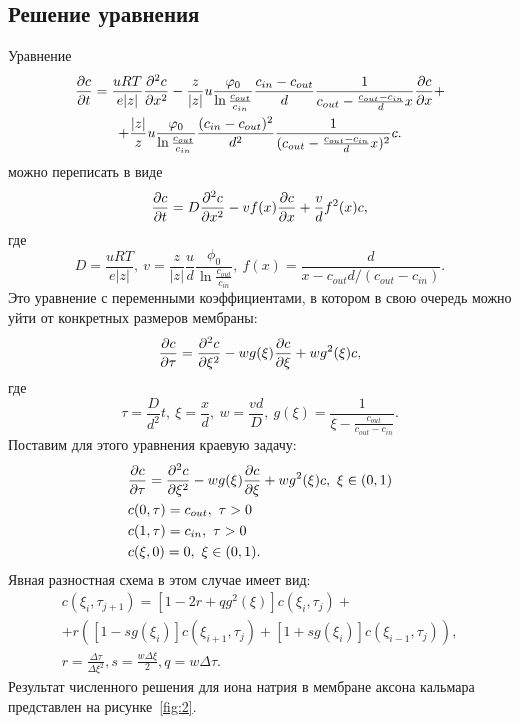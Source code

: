 \subsection{Решение уравнения}
    Уравнение
    \begin{gather*}
        \frac{\partial c}{\partial t} = \frac{uRT}{e|z|}\frac{\partial^2 c}{\partial {x}^2} -
        \frac{z}{|z|}u\frac{\varphi_0}{\ln\frac{c_{out}}{c_{in}}}
        \frac{c_{in} - c_{out}}{d}
        \frac{1}{c_{out} - \frac{c_{out} - c_{in}}{d} x}
        \frac{\partial c}{\partial x} + \\
        + \frac{|z|}{z}u\frac{\varphi_0}{\ln\frac{c_{out}}{c_{in}}}
        \frac{(c_{in} - c_{out})^2}{d^2}
        \frac{1}{(c_{out} - \frac{c_{out} - c_{in}}{d} x)^2}c.
    \end{gather*}
    можно переписать в виде
    \[
        \frac{\partial c}{\partial t} = D\frac{\partial^2 c}{\partial {x}^2} - vf(x)\frac{\partial c}{\partial x} + \frac{v}{d}f^2(x)c,
    \]
    где
    \[
        D = \frac{uRT}{e|z|},\ v = \frac{z}{|z|}\frac{u}{d}
        \frac{\phi_0}{\ln\frac{c_{out}}{c_{in}}},
        \ f(x) = \frac{d}{x - c_{out}d / (c_{out}-c_{in})}.
    \]
    Это уравнение с переменными коэффициентами, в котором в свою очередь можно
    уйти от конкретных размеров мембраны:
    \[
        \frac{\partial c}{\partial \tau} = \frac{\partial^2 c}{\partial {\xi}^2} - wg(\xi)\frac{\partial c}{\partial \xi} + wg^2(\xi)c,
    \]
    где
    \[
        \tau = \frac{D}{d^2}t,\ \xi = \frac{x}{d},\ w = \frac{vd}{D},
        \ g(\xi) = \frac{1}{\xi - \frac{c_{out}}{c_{out} - c_{in}}}.
    \]
    Поставим для этого уравнения краевую задачу:
    \begin{align*}
        & \frac{\partial c}{\partial \tau} = \frac{\partial^2 c}{\partial {\xi}^2} - wg(\xi)\frac{\partial c}{\partial \xi} + wg^2(\xi)c,
            \ \xi\in(0,1) \\
        & c(0, \tau) = c_{out},\ \tau>0 \\
        & c(1, \tau) = c_{in},\ \tau>0 \\
        & c(\xi, 0) = 0,\ \xi\in(0,1).
    \end{align*}
    Явная разностная схема в этом случае имеет вид:
    \begin{gather*}
        c(\xi_i,\tau_{j+1}) =
        [1-2r+qg^2(\xi)]c(\xi_i, \tau_j) +\\
        + r\left(
            [1 - sg(\xi_i)]c(\xi_{i+1},\tau_j) +
            [1 + sg(\xi_i)]c(\xi_{i-1},\tau_j)
        \right),\\
        r = \frac{\Delta\tau}{\Delta\xi^2}, s = \frac{w\Delta\xi}{2},
        q = w\Delta\tau.
    \end{gather*}
    Результат численного решения для иона натрия в мембране аксона кальмара
    представлен на рисунке~\ref{fig:2}.
